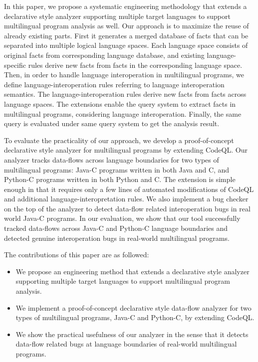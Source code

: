 In this paper, we propose a systematic engineering methodology that extends a
declarative style analyzer supporting multiple target languages to support
multilingual program analysis as well. Our approach is to maximize the reuse of
already existing parts. First it generates a merged database of facts that can
be separated into multiple logical language spaces.  Each language space
consists of original facts from corresponding language database, and existing
language-specific rules derive new facts from facts in the corresponding
language space. Then, in order to handle language interoperation in
multilingual programs, we define language-interoperation rules referring to
language interoperation semantics. The language-interoperation rules derive new
facts from facts across language spaces. The extensions enable the query system
to extract facts in multilingual programs, considering language interoperation.
Finally, the same query is evaluated under same query system to get the
analysis result.

To evaluate the practicality of our approach, we develop a proof-of-concept
declarative style analyzer for multilingual programs by extending CodeQL. Our
analyzer tracks data-flows across language boundaries for two types of
multilingual programs: Java-C programs written in both Java and C, and Python-C
programs written in both Python and C. The extension is simple enough in that
it requires only a few lines of automated modifications of CodeQL and additional
language-interopretation rules. We also implement a bug checker on the top of
the analyzer to detect data-flow related interoperation bugs in real world Java-C programs.
In our evaluation, we show that our tool successfully tracked data-flows across
Java-C and Python-C language boundaries and detected genuine interoperation
bugs in real-world multilingual programs.

The contributions of this paper are as followed:
\begin{itemize}
\item We propose an engineering method that extends a declarative style analyzer
supporting multiple target languages to support multilingual program analysis.

\item We implement a proof-of-concept declarative style data-flow analyzer for two
types of multilingual programs, Java-C and Python-C, by extending CodeQL.

\item We show the practical usefulness of our analyzer in the sense that it detects
data-flow related bugs at language boundaries of real-world multilingual
programs.
\end{itemize}
